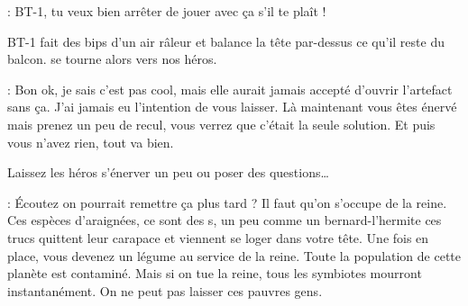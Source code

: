 \begin{quotebox}
\noindent\textbf{}: BT-1, tu veux bien arrêter de jouer avec ça s’il te plaît !
\end{quotebox}
BT-1 fait des bips d’un air râleur et balance la tête par-dessus ce qu’il reste du balcon.  se tourne alors vers nos héros.
\begin{quotebox}
\noindent\textbf{}: Bon ok, je sais c’est pas cool, mais elle aurait jamais accepté d’ouvrir l’artefact sans ça. J’ai jamais eu l’intention de vous laisser. Là maintenant vous êtes énervé mais prenez un peu de recul, vous verrez que c’était la seule solution. Et puis vous n’avez rien, tout va bien.
\end{quotebox}
Laissez les héros s’énerver un peu ou poser des questions\dots
\begin{quotebox}
\noindent\textbf{}: \'Ecoutez on pourrait remettre ça plus tard ? Il faut qu’on s’occupe de la reine. Ces espèces d’araignées, ce sont des s, un peu comme un bernard-l’hermite ces trucs quittent leur carapace et viennent se loger dans votre tête. Une fois en place, vous devenez un légume au service de la reine. Toute la population de cette planète est contaminé. Mais si on tue la reine, tous les symbiotes mourront instantanément. On ne peut pas laisser ces pauvres gens.
\end{quotebox}